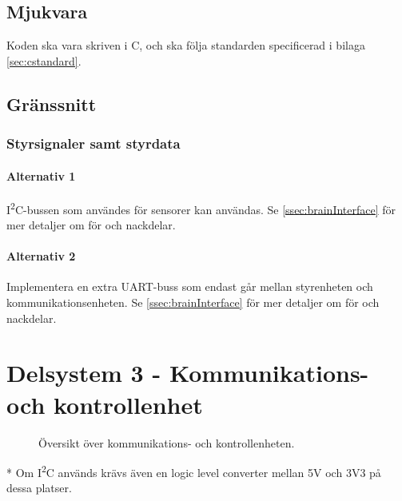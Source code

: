 \documentclass[a4paper,11pt]{article}
\begin{document}
\subsection{Mjukvara}

Koden ska vara skriven i C, och ska följa standarden specificerad i bilaga \ref{sec:cstandard}.

\subsection{Gränssnitt} \label{ssec:controllInterface}

\subsubsection{Styrsignaler samt styrdata}

\paragraph{Alternativ 1}
I\textsuperscript{2}C-bussen som användes för sensorer kan användas. Se \ref{ssec:brainInterface} för mer detaljer om för och nackdelar.

\paragraph{Alternativ 2}
Implementera en extra UART-buss som endast går mellan styrenheten och kommunikationsenheten. Se \ref{ssec:brainInterface} för mer detaljer om för och nackdelar.

\newpage
\section{Delsystem 3 - Kommunikations- och kontrollenhet} \label{sec:system3}
\begin{figure}[h!]
    \caption{Översikt över kommunikations- och kontrollenheten.  }
    \label{fig:modules}
\end{figure}
\noindent \begin{small}
* Om I\textsuperscript{2}C används krävs även en logic level converter mellan 5V och 3V3 på dessa platser.
\end{small}
\end{document}
